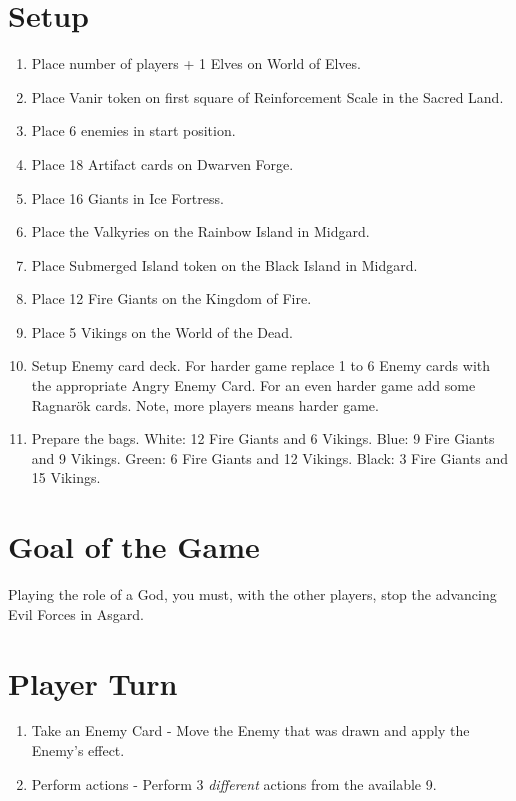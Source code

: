 \documentclass[12pt]{article}
\newenvironment{enumerateCustom}
{\begin{enumerate}
  \setlength{\itemsep}{1pt}
  \setlength{\parskip}{0pt}
  \setlength{\parsep}{0pt}}
{\end{enumerate}}
\begin{document}
\begin{mdframed}[style = customFrame]
\begin{multicols*}{2}

\section*{Setup}
\begin{enumerateCustom}
	\item Place number of players + 1 Elves on World of Elves.
	\item Place Vanir token on first square of Reinforcement Scale in the Sacred Land.
	\item Place 6 enemies in start position.
	\item Place 18 Artifact cards on Dwarven Forge.
	\item Place 16 Giants in Ice Fortress.
	\item Place the Valkyries on the Rainbow Island in Midgard.
	\item Place Submerged Island token on the Black Island in Midgard.
	\item Place 12 Fire Giants on the Kingdom of Fire.
	\item Place 5 Vikings on the World of the Dead.
	\item Setup Enemy card deck. For harder game replace 1 to 6 Enemy cards with the appropriate Angry Enemy Card. For an even harder game add some Ragnar\"ok cards. Note, more players means harder game.
	\item Prepare the bags. White: 12 Fire Giants and 6 Vikings. Blue: 9 Fire Giants and 9 Vikings. Green: 6 Fire Giants and 12 Vikings. Black: 3 Fire Giants and 15 Vikings.
\end{enumerateCustom}

\section*{Goal of the Game}
Playing the role of a God, you must, with the other players, stop the advancing Evil Forces in Asgard.

\section*{Player Turn}
\begin{enumerateCustom}
	\item Take an Enemy Card - Move the Enemy that was drawn and apply the Enemy's effect.
	\item Perform actions - Perform 3 \emph{different} actions from the available 9.
\end{enumerateCustom}


\end{multicols*}
\end{mdframed}
\end{document}
